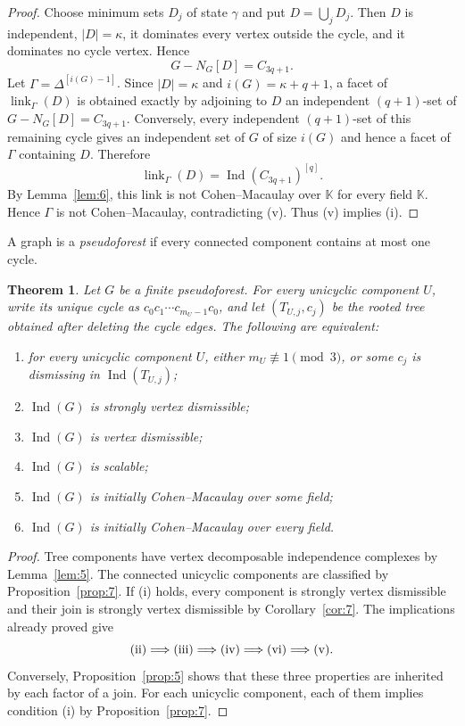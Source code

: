 \documentclass[11pt]{amsart}
\newcommand{\K}{\mathbb K}
\DeclareMathOperator{\link}{link}
\DeclareMathOperator{\Ind}{Ind}
\newtheorem{theorem}{Theorem}[section]
\theoremstyle{definition}
\begin{document}
\begin{proof}
		Choose minimum sets $D_j$ of state $\gamma$ and put $D=\bigcup_jD_j$.  Then $D$ is independent, $|D|=\kappa$, it dominates every vertex outside the cycle, and it dominates no cycle vertex.  Hence
		\[
		G-N_G[D]=C_{3q+1}.
		\]
		Let $\Gamma=\Delta^{[i(G)-1]}$.  Since $|D|=\kappa$ and $i(G)=\kappa+q+1$, a facet of $\link_\Gamma(D)$ is obtained exactly by adjoining to $D$ an independent $(q+1)$-set of $G-N_G[D]=C_{3q+1}$.  Conversely, every independent $(q+1)$-set of this remaining cycle gives an independent set of $G$ of size $i(G)$ and hence a facet of $\Gamma$ containing $D$.  Therefore
		\[
		\link_\Gamma(D)=\Ind(C_{3q+1})^{[q]}.
		\]
		By Lemma~\ref{lem:6}, this link is not Cohen--Macaulay over $\K$ for every field $\K$.  Hence $\Gamma$ is not Cohen--Macaulay, contradicting (v).  Thus (v) implies (i).
	\end{proof}
	
	A graph is a \emph{pseudoforest} if every connected component contains at most one cycle.
	
	\begin{theorem}\label{thm:6}
		Let $G$ be a finite pseudoforest.  For every unicyclic component $U$, write its unique cycle as $c_0c_1\cdots c_{m_U-1}c_0$, and let $(T_{U,j},c_j)$ be the rooted tree obtained after deleting the cycle edges.  The following are equivalent:
		\begin{enumerate}[label=\textup{(\roman*)}]
			\item for every unicyclic component $U$, either $m_U\not\equiv1\pmod3$, or some $c_j$ is dismissing in $\Ind(T_{U,j})$;
			\item $\Ind(G)$ is strongly vertex dismissible;
			\item $\Ind(G)$ is vertex dismissible;
			\item $\Ind(G)$ is scalable;
			\item $\Ind(G)$ is initially Cohen--Macaulay over some field;
			\item $\Ind(G)$ is initially Cohen--Macaulay over every field.
		\end{enumerate}
	\end{theorem}
	
	\begin{proof}
		Tree components have vertex decomposable independence complexes by Lemma~\ref{lem:5}.  The connected unicyclic components are classified by Proposition~\ref{prop:7}.  If (i) holds, every component is strongly vertex dismissible and their join is strongly vertex dismissible by Corollary~\ref{cor:7}.  The implications already proved give
		\[
		\textup{(ii)}\Longrightarrow\textup{(iii)}
		\Longrightarrow\textup{(iv)}
		\Longrightarrow\textup{(vi)}
		\Longrightarrow\textup{(v)}.
		\]
		Conversely, Proposition~\ref{prop:5} shows that these three properties are inherited by each factor of a join.  For each unicyclic component, each of them implies condition (i) by Proposition~\ref{prop:7}.
	\end{proof}
	
\end{document}
